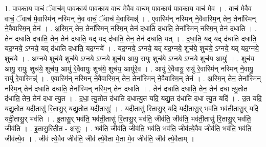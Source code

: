 \documentclass[17pt]{extarticle}
\begin{document}
1. पा॒व॒काय॒ वाचं॒ ॅवाच॑म् पाव॒काय॑ पाव॒काय॒ वाच॑ मे॒वैव वाच॑म् पाव॒काय॑ पाव॒काय॒ वाच॑ मे॒व । . वाच॑ मे॒वैव वाचं॒ ॅवाच॑ मे॒वास्मि॑न् नस्मिन् ने॒व वाचं॒ ॅवाच॑ मे॒वास्मिन्न्॑ । . ए॒वास्मि॑न् नस्मिन् ने॒वैवास्मि॒न् तेन॒ तेना᳚स्मिन् ने॒वैवास्मि॒न् तेन॑ । . अ॒स्मि॒न् तेन॒ तेना᳚स्मिन् नस्मि॒न् तेन॑ दधाति दधाति॒ तेना᳚स्मिन् नस्मि॒न् तेन॑ दधाति । . तेन॑ दधाति दधाति॒ तेन॒ तेन॑ दधाति॒ यद् यद् द॑धाति॒ तेन॒ तेन॑ दधाति॒ यत् । . द॒धा॒ति॒ यद् यद् द॑धाति दधाति॒ यद॒ग्नये॒ ऽग्नये॒ यद् द॑धाति दधाति॒ यद॒ग्नये᳚ । . यद॒ग्नये॒ ऽग्नये॒ यद् यद॒ग्नये॒ शुच॑ये॒ शुच॑ये॒ ऽग्नये॒ यद् यद॒ग्नये॒ शुच॑ये । . अ॒ग्नये॒ शुच॑ये॒ शुच॑ये॒ ऽग्नये॒ ऽग्नये॒ शुच॑य॒ आयु॒ रायुः॒ शुच॑ये॒ ऽग्नये॒ ऽग्नये॒ शुच॑य॒ आयुः॑ । . शुच॑य॒ आयु॒ रायुः॒ शुच॑ये॒ शुच॑य॒ आयु॑ रे॒वैवायुः॒ शुच॑ये॒ शुच॑य॒ आयु॑रे॒व । . आयु॑ रे॒वैवायु॒ रायु॑ रे॒वास्मि॑न् नस्मिन् ने॒वायु॒ रायु॑ रे॒वास्मिन्न्॑ । . ए॒वास्मि॑न् नस्मिन् ने॒वैवास्मि॒न् तेन॒ तेना᳚स्मिन् ने॒वैवास्मि॒न् तेन॑ । . अ॒स्मि॒न् तेन॒ तेना᳚स्मिन् नस्मि॒न् तेन॑ दधाति दधाति॒ तेना᳚स्मिन् नस्मि॒न् तेन॑ दधाति । . तेन॑ दधाति दधाति॒ तेन॒ तेन॑ दधा त्यु॒तोत द॑धाति॒ तेन॒ तेन॑ दधा त्यु॒त । . द॒धा॒ त्यु॒तोत द॑धाति दधात्यु॒त यदि॒ यद्यु॒त द॑धाति दधा त्यु॒त यदि॑ । . उ॒त यदि॒ यद्यु॒तोत यदी॒तासु॑ रि॒तासु॒र् यद्यु॒तोत यदी॒तासुः॑ । . यदी॒तासु॑ रि॒तासु॒र् यदि॒ यदी॒तासु॒र् भव॑ति॒ भव॑ती॒तासु॒र् यदि॒ यदी॒तासु॒र् भव॑ति । . इ॒तासु॒र् भव॑ति॒ भव॑ती॒तासु॑ रि॒तासु॒र् भव॑ति॒ जीव॑ति॒ जीव॑ति॒ भव॑ती॒तासु॑ रि॒तासु॒र् भव॑ति॒ जीव॑ति । . इ॒तासु॒रिती॒त - अ॒सुः॒ । . भव॑ति॒ जीव॑ति॒ जीव॑ति॒ भव॑ति॒ भव॑ति॒ जीव॑त्ये॒वैव जीव॑ति॒ भव॑ति॒ भव॑ति॒ जीव॑त्ये॒व । . जीव॑ त्ये॒वैव जीव॑ति॒ जीव॑ त्ये॒वैता मे॒ता मे॒व जीव॑ति॒ जीव॑ त्ये॒वैताम् । \newline
\end{document}
